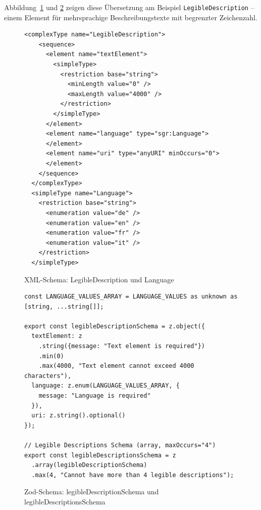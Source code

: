 \documentclass[a4paper,12pt]{article}
\newcommand{\code}[1]{\texttt{#1}}
\begin{document}
\noindent Abbildung~\ref{fig:xsd-legible-description} und \ref{fig:zod-legible-description} zeigen diese Übersetzung 
am Beispiel \code{LegibleDescription} -- einem Element für mehrsprachige Beschreibungstexte mit begrenzter 
Zeichenzahl.

\begin{figure}[H]
    \centering
    \begin{lstlisting}[language=xsdselective,frame=single,backgroundcolor=\color{gray!10},basicstyle=\ttfamily\scriptsize,breaklines=true]
  <complexType name="LegibleDescription">
    <sequence>
      <element name="textElement">
        <simpleType>
          <restriction base="string">
            <minLength value="0" />
            <maxLength value="4000" />
          </restriction>
        </simpleType>
      </element>
      <element name="language" type="sgr:Language">
      </element>
      <element name="uri" type="anyURI" minOccurs="0">
      </element>
    </sequence>
  </complexType>
  <simpleType name="Language">
    <restriction base="string">
      <enumeration value="de" />
      <enumeration value="en" />
      <enumeration value="fr" />
      <enumeration value="it" />
    </restriction>
  </simpleType>
    \end{lstlisting}
    \caption{XML-Schema: LegibleDescription und Language}
    \label{fig:xsd-legible-description}
\end{figure}

\begin{figure}[H]
    \centering
    \begin{lstlisting}[language=typescriptselective,frame=single,backgroundcolor=\color{gray!10},basicstyle=\ttfamily\scriptsize,breaklines=true]
const LANGUAGE_VALUES_ARRAY = LANGUAGE_VALUES as unknown as [string, ...string[]];

export const legibleDescriptionSchema = z.object({
  textElement: z
    .string({message: "Text element is required"})
    .min(0)
    .max(4000, "Text element cannot exceed 4000 characters"),
  language: z.enum(LANGUAGE_VALUES_ARRAY, {
    message: "Language is required"
  }),
  uri: z.string().optional()
});

// Legible Descriptions Schema (array, maxOccurs="4")
export const legibleDescriptionsSchema = z
  .array(legibleDescriptionSchema)
  .max(4, "Cannot have more than 4 legible descriptions");
    \end{lstlisting}
    \caption{Zod-Schema: legibleDescriptionSchema und legibleDescriptionsSchema}
    \label{fig:zod-legible-description}
\end{figure}
\end{document}
